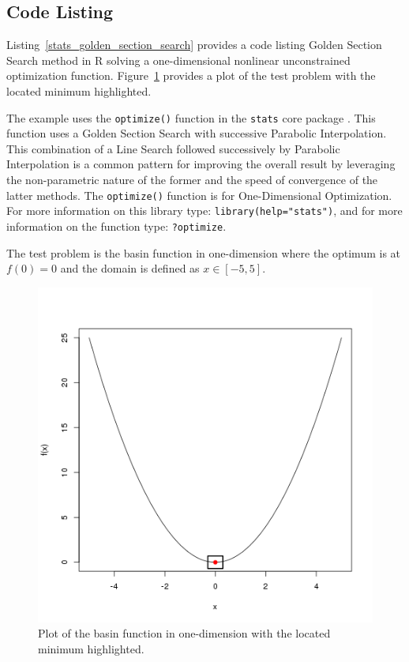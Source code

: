 \subsection{Code Listing}
Listing~\ref{stats_golden_section_search} provides a code listing Golden Section Search method in R solving a one-dimensional nonlinear unconstrained optimization function. Figure~\ref{plot:golden_section_search_result} provides a plot of the test problem with the located minimum highlighted.

The example uses the \texttt{optimize()} function in the \texttt{stats} core package \cite{RDCT2011a}. This function uses a Golden Section Search with successive Parabolic Interpolation. This combination of a Line Search followed successively by Parabolic Interpolation is a common pattern for improving the overall result by leveraging the non-parametric nature of the former and the speed of convergence of the latter methods. The \texttt{optimize()} function is for One-Dimensional Optimization. For more information on this library type: \texttt{library(help="stats")}, and for more information on the function type: \texttt{?optimize}.

The test problem is the basin function in one-dimension where the optimum is at $f(0)=0$ and the domain is defined as $x \in [-5,5]$. 



\begin{figure}[htp]
\centering
\includegraphics[scale=0.45]{book/a_optimization/golden_section_search_result.png}
\caption{Plot of the basin function in one-dimension with the located minimum highlighted.}
\label{plot:golden_section_search_result}
\end{figure}

